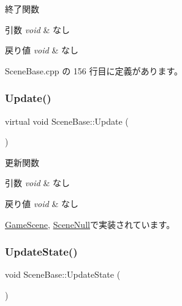 終了関数 


\begin{DoxyParams}{引数}
{\em void} & なし \\
\hline
\end{DoxyParams}

\begin{DoxyRetVals}{戻り値}
{\em void} & なし \\
\hline
\end{DoxyRetVals}


 Scene\+Base.\+cpp の 156 行目に定義があります。

\mbox{\label{class_scene_base_a596ef75258a6e4d843d81f01cc0c28da}} 
\subsubsection{\texorpdfstring{Update()}{Update()}}
{\footnotesize\ttfamily virtual void Scene\+Base\+::\+Update (\begin{DoxyParamCaption}{ }\end{DoxyParamCaption})\hspace{0.3cm}{\ttfamily [pure virtual]}}



更新関数 


\begin{DoxyParams}{引数}
{\em void} & なし \\
\hline
\end{DoxyParams}

\begin{DoxyRetVals}{戻り値}
{\em void} & なし \\
\hline
\end{DoxyRetVals}


\mbox{\hyperlink{class_game_scene_a4a7840220ef38af15def6d25159c93f3}{Game\+Scene}}, \mbox{\hyperlink{class_scene_null_a79de810b699f496fda20e4ac837d075a}{Scene\+Null}}で実装されています。

\mbox{\label{class_scene_base_a41ad04b353238b90571560d6b12e093c}} 
\subsubsection{\texorpdfstring{Update\+State()}{UpdateState()}}
{\footnotesize\ttfamily void Scene\+Base\+::\+Update\+State (\begin{DoxyParamCaption}{ }\end{DoxyParamCaption})\hspace{0.3cm}{\ttfamily [protected]}}



